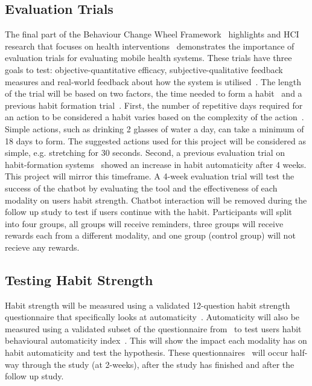 \subsection{Evaluation Trials}
The final part of the Behaviour Change Wheel Framework~\cite{article_behaviour_change_wheel} highlights and HCI research that focuses on health interventions~\cite{article_mhealth} demonstrates the importance of evaluation trials for evaluating mobile health systems. These trials have three goals to test: objective-quantitative efficacy, subjective-qualitative feedback measures and real-world feedback about how the system is utilised~\cite{article_evaluate_tech_health_behaviour_change}.\newline
\newline
The length of the trial will be based on two factors, the time needed to form a habit~\cite{article_how_habits_formed_modelling_habit_formation} and a previous habit formation trial~\cite{article_beyond_self_tracking_designing_apps}. First, the number of repetitive days required for an action to be considered a habit varies based on the complexity of the action~\cite{article_how_habits_formed_modelling_habit_formation}. Simple actions, such as drinking 2 glasses of water a day, can take a minimum of 18 days to form. The suggested actions used for this project will be considered as simple, e.g. stretching for 30 seconds. Second, a previous evaluation trial on habit-formation systems~\cite{article_how_habits_formed_modelling_habit_formation} showed an increase in habit automaticity after 4 weeks. This project will mirror this timeframe.\newline
\newline
A 4-week evaluation trial will test the success of the chatbot by evaluating the tool and the effectiveness of each modality on users habit strength. Chatbot interaction will be removed during the follow up study to test if users continue with the habit. Participants will split into four groups, all groups will receive reminders, three groups will receive rewards each from a different modality, and one group (control group) will not recieve any rewards.

\subsection{Testing Habit Strength}
Habit strength will be measured using a validated 12-question habit strength questionnaire that specifically looks at automaticity~\cite{article_habit_strength}. Automaticity will also be measured using a validated subset of the questionnaire from~\cite{article_habit_strength} to test users habit behavioural automaticity index~\cite{article_habit_measurement}. This will show the impact each modality has on habit automaticity and test the hypothesis. These questionnaires~\cite{article_habit_strength, article_habit_measurement} will occur half-way through the study (at 2-weeks), after the study has finished and after the follow up study.
